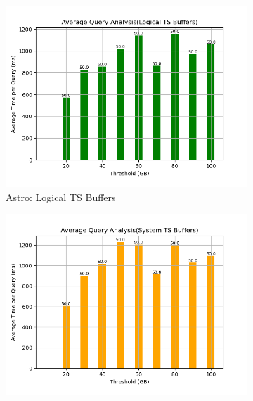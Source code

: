 \begin{figure}
	\centering
	\begin{subfigure}[c]{0.45\textwidth}
		\includegraphics[width=1\textwidth]   {figures/Experiments/Dynamic/ASTRO/Batch_processing/70/average_query_time_per_batch_version_999777015_10485760_10_delay[70].png}
		\caption{Astro: Logical TS Buffers}
		\label{fig:logical-ts-70-astro}
	\end{subfigure}
	\begin{subfigure}[c]{0.45\textwidth}
		\includegraphics[width=1\textwidth]	 {figures/Experiments/Dynamic/ASTRO/Batch_processing/70/average_query_time_per_batch_version_999777018_10485760_10_delay[70].png}

\end{subfigure}
\end{figure}
